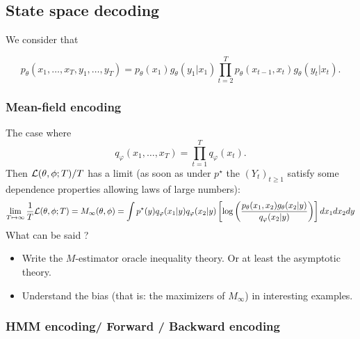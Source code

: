 \documentclass{article}
\newcommand{\1}{\mathbbm{1}}
\newcounter{example}[section]
\begin{document}
 
\subsection{State space decoding}
We consider that 

$$p_{\theta}(x_{1},\ldots,x_{T},y_{1},\ldots,y_{T})=p_{\theta}(x_{1})g_{\theta}(y_{1}\vert x_{1})\prod_{t=2}^{T}p_{\theta}(x_{t-1},x_{t})g_{\theta}(y_{t} \vert x_{t}).
$$ 


\subsubsection{Mean-field encoding}
The case where
$$q_{\varphi}(x_{1},\ldots,x_{T})=\prod_{t=1}^{T}q_{\varphi}(x_{t}).$$
Then ${\cal L}(\theta,\phi; T)/T$ has a limit (as soon as under $p^{\star}$ the $(Y_{t})_{t\geq 1}$ satisfy some dependence properties allowing laws of large numbers):
$$
\lim_{T\mapsto \infty}\frac{1}{T}{\cal L}(\theta,\phi; T) = M_{\infty}(\theta,\phi)=\int p^{\star}(y) q_{\varphi}(x_{1}\vert y)q_{\varphi}(x_{2}\vert y)
 \left[\log \left(\frac{p_{\theta}(x_{1},x_{2} ) g_{\theta}(x_{2}\vert y)}{q_{\varphi}(x_{2}\vert y)} \right)\right]
dx_{1}dx_{2}dy
$$
What can be said ?
\begin{itemize}
\item
Write the $M$-estimator  oracle inequality theory. Or at least the asymptotic theory.
\item
Understand the bias (that is: the maximizers of $M_{\infty}$) in interesting examples.
\end{itemize}

\subsubsection{HMM encoding/ Forward / Backward encoding}
\end{document}
